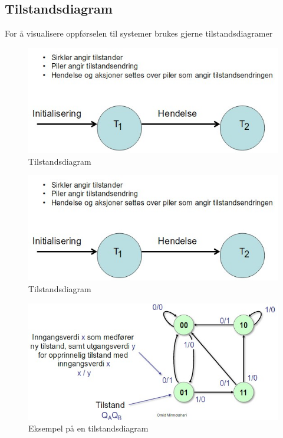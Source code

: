 \documentclass{article}
\begin{document}
	\subsection{Tilstandsdiagram}
	
	For å visualisere oppførselen til systemer brukes gjerne tilstandsdiagramer
	
	\begin{figure}[H]
		\includegraphics[scale = 0.6]{tilstanddiagram.jpg}
		\caption{Tilstandsdiagram}
	\end{figure}
	
	\begin{figure}[H]
		\includegraphics[scale = 0.6]{tilstanddiagram.jpg}
		\caption{Tilstandsdiagram}
	\end{figure}
	
	\begin{figure}[H]
		\includegraphics[scale = 0.6]{tilstandeks.jpg}
		\caption{Eksempel på en tilstandsdiagram}
	\end{figure}
	
\end{document}
